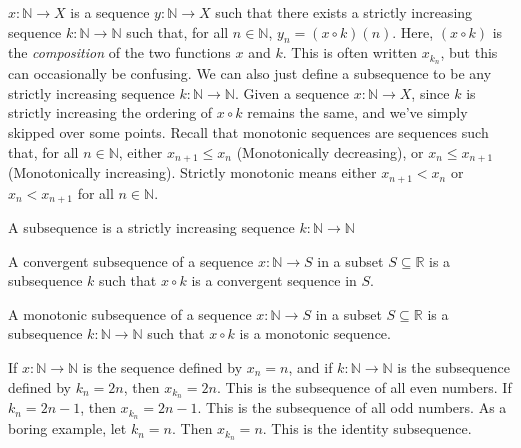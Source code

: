             $x:\mathbb{N}\rightarrow{X}$ is a sequence 
            $y:\mathbb{N}\rightarrow{X}$ such that there exists
            a strictly increasing sequence
            $k:\mathbb{N}\rightarrow\mathbb{N}$ such that, for all
            $n\in\mathbb{N}$, $y_{n}=(x\circ{k})(n)$. Here,
            $(x\circ{k})$ is the \textit{composition} of
            the two functions $x$ and $k$. This is
            often written $x_{k_{n}}$, but this can occasionally
            be confusing. We can also just define a subsequence
            to be any strictly increasing sequence
            $k:\mathbb{N}\rightarrow\mathbb{N}$. Given a sequence
            $x:\mathbb{N}\rightarrow{X}$, since $k$ is strictly
            increasing the ordering of $x\circ{k}$
            remains the same, and we've simply skipped over
            some points. Recall that
            monotonic sequences are sequences such
            that, for all $n\in\mathbb{N}$, either
            $x_{n+1}\leq{x_{n}}$ (Monotonically decreasing),
            or $x_{n}\leq{x_{n+1}}$ (Monotonically increasing).
            Strictly monotonic means either $x_{n+1}<x_{n}$
            or $x_{n}<x_{n+1}$ for all $n\in\mathbb{N}$.
            \begin{definition}
                A subsequence is a strictly increasing sequence
                $k:\mathbb{N}\rightarrow\mathbb{N}$
            \end{definition}
            \begin{definition}
                A convergent subsequence of a sequence
                $x:\mathbb{N}\rightarrow{S}$ in
                a subset $S\subseteq\mathbb{R}$ is a
                subsequence $k$ such that
                $x\circ{k}$ is a convergent sequence in $S$.
            \end{definition}
            \begin{definition}
                A monotonic subsequence of a sequence
                $x:\mathbb{N}\rightarrow{S}$ in a subset
                $S\subseteq\mathbb{R}$ is a subsequence
                $k:\mathbb{N}\rightarrow\mathbb{N}$ such
                that $x\circ{k}$ is a monotonic sequence.
            \end{definition}
            \begin{example}
                If $x:\mathbb{N}\rightarrow\mathbb{N}$ is
                the sequence defined by $x_{n}=n$, and if
                $k:\mathbb{N}\rightarrow\mathbb{N}$ is the
                subsequence defined by
                $k_{n}=2n$, then $x_{k_{n}}=2n$. This is the
                subsequence of all even numbers.
                If $k_{n}=2n-1$, then $x_{k_{n}}=2n-1$. This
                is the subsequence of all odd numbers. As a
                boring example, let $k_{n}=n$. Then
                $x_{k_{n}}=n$. This is the identity subsequence.
            \end{example}
